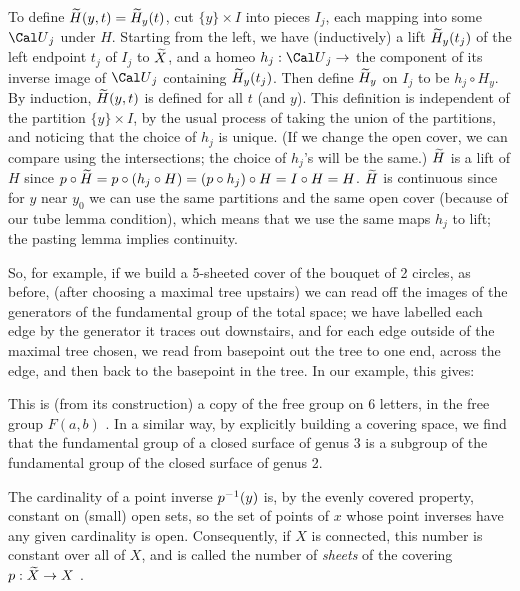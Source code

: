 To define $\widetilde{H}(y,t)=\widetilde{H}_y(t)$, cut $\{y\}\times I$ into pieces $I_j$,
each mapping into some ${\Cal U}_{j}$ under $H$. Starting from the left,
we have (inductively) a lift $\widetilde{H}_y(t_j)$ of the left endpoint $t_j$ of $I_j$ to $\widetilde{X}$,
and a homeo $h_j:{\Cal U}_{j}\ra$ the component of its inverse image of ${\Cal U}_j$
containing $\widetilde{H}_y(t_j)$. Then define $\widetilde{H}_y$ on $I_j$
to be $h_j\circ {H}_y$. By induction, $\widetilde{H}(y,t)$ is defined for all $t$ 
(and $y$). This definition is independent of the partition $\{y\}\times I$,
by the usual process of taking the union of the partitions, and noticing that
the choice of $h_j$ is unique. (If we change the open cover,
we can compare using the intersections; the choice of $h_j$'s will be the
same.)
$\widetilde{H}$ is a lift of $H$ since 
$p\circ \widetilde{H} = p\circ (h_j\circ H) = (p\circ h_j)\circ H=I\circ H = H$.
$\widetilde{H}$ is continuous since for $y$ near $y_0$ we can use the same partitions 
and the same open cover (because of our tube lemma condition), which means 
that we use the same maps $h_j$ to lift; the pasting lemma implies continuity.

\vfill
\eject

So, for example, if we build a 5-sheeted cover of the bouquet of 2 circles, 
as before, (after choosing a maximal tree upstairs) 
we can read off the images of the generators of the fundamental group
of the total space; we have labelled each edge by the generator it
traces out downstairs, and for each edge outside of the maximal tree
chosen, we read from basepoint out the tree to one end, across the edge,
and then back to the basepoint in the tree. In our example, this
gives:


\msk


\msk

\leavevmode


\epsfxsize=3in


\bsk

This is (from its construction) a copy of the free group on 6 letters,
in the free group $F(a,b)$ . In a similar way, by explicitly building
a covering space, we find that the fundamental group of a closed 
surface of genus 3 is a subgroup of the fundamental group of the 
closed surface of genus 2. 

\vfill
\eject

The cardinality of a point inverse $p^{-1}(y)$ is, by the evenly
covered property, constant on (small) open sets, so the set of 
points of $x$ whose point inverses have any given cardinality
is open. Consequently, if $X$ is connected, this number
is constant over all of $X$, and is called the number of {\it sheets}
of the covering $p:\widetilde{X}\rightarrow X$ . 

